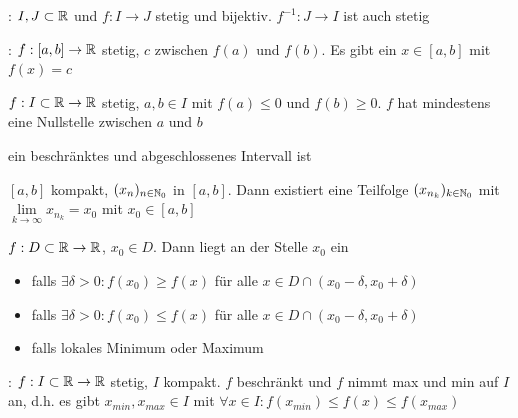 \Satz {}: $I, J \subset \mathbb{R}$ und $f: I \to J$ stetig und
bijektiv. $f^{-1}: J \to I$ ist auch stetig

\Satz {}: $f: [a, b] \to \mathbb{R}$ stetig, $c$ zwischen $f(a)$ und $f(b)$.
Es gibt ein $x \in [a, b]$ mit $f(x) = c$

\Kor $f: I \subset \mathbb{R} \to \mathbb{R}$ stetig, $a, b \in I$ mit $f(a) \le 0$ und $f(b) \ge 0$.
$f$ hat mindestens eine Nullstelle zwischen $a$ und $b$

\Def ein beschränktes und abgeschlossenes Intervall ist 

\Satz $[a, b]$ kompakt, $(x_n)_{n\in\mathbb{N}_0}$ in $[a, b]$.
Dann existiert eine Teilfolge $(x_{n_k})_{k\in\mathbb{N}_0}$ mit $\lim\limits_{k\to\infty} x_{n_k} = x_0$ mit $x_0 \in [a, b]$

\Def $f: D \subset \mathbb{R} \to \mathbb{R}$, $x_0 \in D$. Dann liegt an der Stelle $x_0$ ein
\vspace{-0.6em}
\begin{itemize}
    \item {} falls $\exists \delta > 0 : f(x_0) \ge f(x)$ für alle $x \in D \cap (x_0 - \delta, x_0 + \delta)$
    \item {} falls $\exists \delta > 0 : f(x_0) \le f(x)$ für alle $x \in D \cap (x_0 - \delta, x_0 + \delta)$
    \item {} falls lokales Minimum oder Maximum
\end{itemize}

\Satz {}: $f: I \subset \mathbb{R} \to \mathbb{R}$ stetig,
$I$ kompakt. $f$ beschränkt und $f$ nimmt max und min auf $I$ an,
d.h. es gibt $x_{min}, x_{max} \in I$ mit $\forall x \in I : f(x_{min}) \le f(x) \le f(x_{max})$
